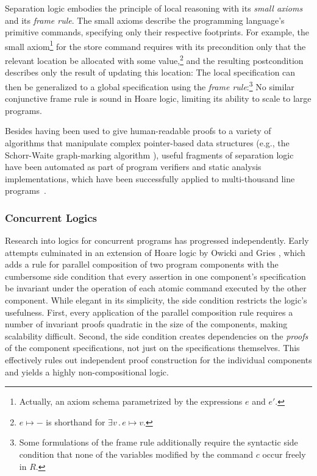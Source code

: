 \documentclass[11pt]{article}
\begin{document}
Separation logic embodies the principle of local reasoning with its \emph{small axioms} and its \emph{frame rule}. The small axioms describe the programming language's primitive commands, specifying only their respective footprints. For example, the small axiom\footnote{Actually, an axiom schema parametrized by the expressions $e$ and $e'$.} for the store command requires with its precondition only that the relevant location be allocated with some value,\footnote{$e \mapsto -$ is shorthand for $\exists v\,.\,e \mapsto v$.} and the resulting postcondition describes only the result of updating this location:  The local specification can then be generalized to a global specification using the \emph{frame rule}:\footnote{Some formulations of the frame rule additionally require the syntactic side condition that none of the variables modified by the command $c$ occur freely in $R$.}   No similar conjunctive frame rule is sound in Hoare logic, limiting its ability to scale to large programs.

Besides having been used to give human-readable proofs to a variety of algorithms that manipulate complex pointer-based data structures (e.g., the Schorr-Waite graph-marking algorithm \cite{Yang-thesis}), useful fragments of separation logic have been automated as part of program verifiers and static analysis implementations, which have been successfully applied to multi-thousand line programs~\cite{DBLP:conf/fmco/BerdineCO05,DBLP:conf/cav/YangLBCCDO08}.

\subsubsection{Concurrent Logics}

Research into logics for concurrent programs has progressed independently. Early attempts culminated in an extension of Hoare logic by Owicki and Gries \cite{DBLP:journals/cacm/OwickiG76}, which adds a rule for parallel composition of two program components with the cumbersome side condition that every assertion in one component's specification be invariant under the operation of each atomic command executed by the other component. While elegant in its simplicity, the side condition restricts the logic's usefulness. First, every application of the parallel composition rule requires a number of invariant proofs quadratic in the size of the components, making scalability difficult. Second, the side condition creates dependencies on the \emph{proofs} of the component specifications, not just on the specifications themselves. This effectively rules out independent proof construction for the individual components and yields a highly non-compositional logic.
\end{document}
